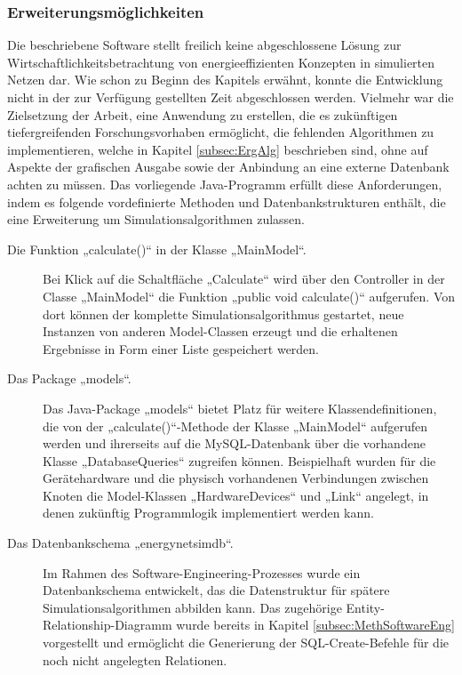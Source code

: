 \subsubsection{Erweiterungsmöglichkeiten} \label{subsubsec:ErgSoftwErweiterung}
Die beschriebene Software stellt freilich keine abgeschlossene Lösung zur Wirtschaftlichkeitsbetrachtung von energieeffizienten Konzepten in simulierten Netzen dar. Wie schon zu Beginn des Kapitels erwähnt, konnte die Entwicklung nicht in der zur Verfügung gestellten Zeit abgeschlossen werden. Vielmehr war die Zielsetzung der Arbeit, eine Anwendung zu erstellen, die es zukünftigen tiefergreifenden Forschungsvorhaben ermöglicht, die fehlenden Algorithmen zu implementieren, welche in Kapitel \ref{subsec:ErgAlg} beschrieben sind, ohne auf Aspekte der grafischen Ausgabe sowie der Anbindung an eine externe Datenbank achten zu müssen.
Das vorliegende Java-Programm erfüllt diese Anforderungen, indem es folgende vordefinierte Methoden und Datenbankstrukturen enthält, die eine Erweiterung um Simulationsalgorithmen zulassen.

\begin{description}
\item [Die Funktion „calculate()“ in der Klasse „MainModel“.] Bei Klick auf die Schaltfläche „Calculate“ wird über den Controller in der Classe „MainModel“ die Funktion „public void calculate()“ aufgerufen. Von dort können der komplette Simulationsalgorithmus gestartet, neue Instanzen von anderen Model-Classen erzeugt und die erhaltenen Ergebnisse in Form einer Liste gespeichert werden.
\item [Das Package „models“.] Das Java-Package „models“ bietet Platz für weitere Klassendefinitionen, die von der „calculate()“-Methode der Klasse „MainModel“ aufgerufen werden und ihrerseits auf die MySQL-Datenbank über die vorhandene Klasse „DatabaseQueries“ zugreifen können. Beispielhaft wurden für die Gerätehardware und die physisch vorhandenen Verbindungen zwischen Knoten die Model-Klassen „HardwareDevices“ und „Link“ angelegt, in denen zukünftig Programmlogik implementiert werden kann.
\item [Das Datenbankschema „energynetsimdb“.] Im Rahmen des Software-Engineering-Prozesses wurde ein Datenbankschema entwickelt, das die Datenstruktur für spätere Simulationsalgorithmen abbilden kann. Das zugehörige Entity-Relationship-Diagramm wurde bereits in Kapitel \ref{subsec:MethSoftwareEng} vorgestellt und ermöglicht die Generierung der SQL-Create-Befehle für die noch nicht angelegten Relationen.
\end{description}

